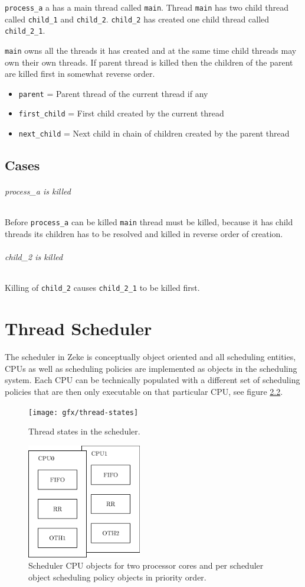 \verb+process_a+ a has a main thread called \verb+main+. Thread
\verb+main+ has two child thread called \verb+child_1+ and \verb+child_2+.
\verb+child_2+ has created one child thread called \verb+child_2_1+.

\verb+main+ owns all the threads it has created and at the same time child
threads may own their own threads. If parent thread is killed then the
children of the parent are killed first in somewhat reverse order.

\begin{itemize}
  \item \verb+parent+ = Parent thread of the current thread if any
  \item \verb+first_child+ = First child created by the current thread
  \item \verb+next_child+ = Next child in chain of children created by the
        parent thread
\end{itemize}

\section{Cases}
\subparagraph*{process\_a is killed}

Before \verb+process_a+ can be killed \verb+main+ thread must be killed,
because it has child threads its children has to be resolved and killed in
reverse order of creation.

\subparagraph*{child\_2 is killed}

Killing of \verb+child_2+ causes \verb+child_2_1+ to be killed first.


\chapter{Thread Scheduler}

The scheduler in Zeke is conceptually object oriented and all
scheduling entities, CPUs as well as scheduling policies are
implemented as objects in the scheduling system. Each CPU can
be technically populated with a different set of scheduling
policies that are then only executable on that particular
CPU, see figure \ref{figure:objscheds}.


\begin{figure}
  \center
  \texttt{[image: gfx/thread-states]}
  \caption{Thread states in the scheduler.}
  \label{figure:objscheds}
\end{figure}

\begin{figure}
  \center
  \includegraphics[width=5cm]{proc/objscheds}
  \caption{Scheduler CPU objects for two processor cores and
           per scheduler object scheduling policy objects in
           priority order.}
  \label{figure:objscheds}
\end{figure}
